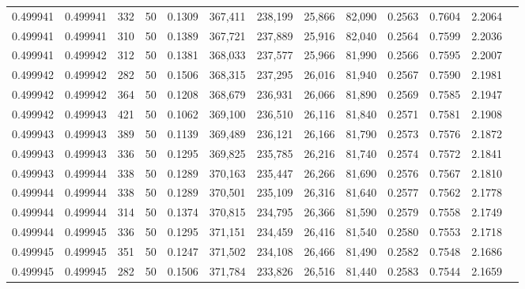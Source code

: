 \begin{tabular}{rrrrrrrrrrrrr}
0.499941 & 0.499941 &   332 &  50 &                                     0.1309 & 367,411 & 238,199 &  25,866 &  82,090 & 0.2563 & 0.7604 & 2.2064 \\
0.499941 & 0.499941 &   310 &  50 &                                     0.1389 & 367,721 & 237,889 &  25,916 &  82,040 & 0.2564 & 0.7599 & 2.2036 \\
0.499941 & 0.499942 &   312 &  50 &                                     0.1381 & 368,033 & 237,577 &  25,966 &  81,990 & 0.2566 & 0.7595 & 2.2007 \\
0.499942 & 0.499942 &   282 &  50 &                                     0.1506 & 368,315 & 237,295 &  26,016 &  81,940 & 0.2567 & 0.7590 & 2.1981 \\
0.499942 & 0.499942 &   364 &  50 &                                     0.1208 & 368,679 & 236,931 &  26,066 &  81,890 & 0.2569 & 0.7585 & 2.1947 \\
0.499942 & 0.499943 &   421 &  50 &                                     0.1062 & 369,100 & 236,510 &  26,116 &  81,840 & 0.2571 & 0.7581 & 2.1908 \\
0.499943 & 0.499943 &   389 &  50 &                                     0.1139 & 369,489 & 236,121 &  26,166 &  81,790 & 0.2573 & 0.7576 & 2.1872 \\
0.499943 & 0.499943 &   336 &  50 &                                     0.1295 & 369,825 & 235,785 &  26,216 &  81,740 & 0.2574 & 0.7572 & 2.1841 \\
0.499943 & 0.499944 &   338 &  50 &                                     0.1289 & 370,163 & 235,447 &  26,266 &  81,690 & 0.2576 & 0.7567 & 2.1810 \\
0.499944 & 0.499944 &   338 &  50 &                                     0.1289 & 370,501 & 235,109 &  26,316 &  81,640 & 0.2577 & 0.7562 & 2.1778 \\
0.499944 & 0.499944 &   314 &  50 &                                     0.1374 & 370,815 & 234,795 &  26,366 &  81,590 & 0.2579 & 0.7558 & 2.1749 \\
0.499944 & 0.499945 &   336 &  50 &                                     0.1295 & 371,151 & 234,459 &  26,416 &  81,540 & 0.2580 & 0.7553 & 2.1718 \\
0.499945 & 0.499945 &   351 &  50 &                                     0.1247 & 371,502 & 234,108 &  26,466 &  81,490 & 0.2582 & 0.7548 & 2.1686 \\
0.499945 & 0.499945 &   282 &  50 &                                     0.1506 & 371,784 & 233,826 &  26,516 &  81,440 & 0.2583 & 0.7544 & 2.1659 \\

\end{tabular}
